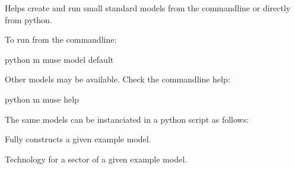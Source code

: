 \documentclass[letterpaper,10pt,english]{sphinxmanual}
\begin{document}
Helps create and run small standard models from the command\sphinxhyphen{}line or directly from
python.

To run from the command\sphinxhyphen{}line:

\begin{sphinxVerbatim}[commandchars=\\\{\}]
python \PYGZhy{}m muse \PYGZhy{}\PYGZhy{}model default
\end{sphinxVerbatim}

Other models may be available. Check the command\sphinxhyphen{}line help:

\begin{sphinxVerbatim}[commandchars=\\\{\}]
python \PYGZhy{}m muse \PYGZhy{}\PYGZhy{}help
\end{sphinxVerbatim}

The same models can be instanciated in a python script as follows:

\begin{sphinxVerbatim}[commandchars=\\\{\}]
   
  
\end{sphinxVerbatim}

\begin{fulllineitems}
\label{\detokenize{api:muse.examples.model}}
Fully constructs a given example model.

\end{fulllineitems}


\begin{fulllineitems}
\label{\detokenize{api:muse.examples.technodata}}
Technology for a sector of a given example model.

\end{fulllineitems}
\end{document}
